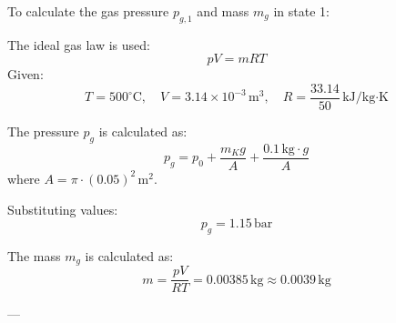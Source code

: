 To calculate the gas pressure \( p_{g,1} \) and mass \( m_g \) in state 1:  

The ideal gas law is used:  
\[
p V = m R T
\]  
Given:  
\[
T = 500^\circ\text{C}, \quad V = 3.14 \times 10^{-3} \, \text{m}^3, \quad R = \frac{33.14}{50} \, \text{kJ/kg·K}
\]  

The pressure \( p_g \) is calculated as:  
\[
p_g = p_0 + \frac{m_K g}{A} + \frac{0.1 \, \text{kg} \cdot g}{A}
\]  
where \( A = \pi \cdot (0.05)^2 \, \text{m}^2 \).  

Substituting values:  
\[
p_g = 1.15 \, \text{bar}
\]  

The mass \( m_g \) is calculated as:  
\[
m = \frac{p V}{R T} = 0.00385 \, \text{kg} \approx 0.0039 \, \text{kg}
\]  

---
